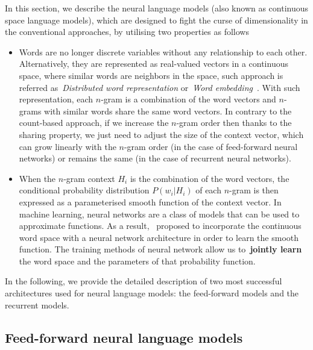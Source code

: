 In this section, we describe the neural language models (also known as continuous space language models), which are designed to fight the curse of dimensionality in the conventional approaches, by utilising two properties as follows

\begin{itemize}
	\item Words are no longer discrete variables without any relationship to each other. Alternatively, they are represented as real-valued vectors in a continuous space, where similar words are neighbors in the space, such approach is referred as~\textit{Distributed word representation} or~\textit{Word embedding}~\cite{bengio2003neural,mikolov2010recurrent}. With such representation, each $n$-gram is a combination of the word vectors and $n$-grams with similar words share the same word vectors.  In contrary to the count-based approach, if we increase the $n$-gram order then thanks to the sharing property, we just need to adjust the size of the context vector, which can grow linearly with the $n$-gram order (in the case of feed-forward neural networks) or remains the same (in the case of recurrent neural networks).
	
	\item When the $n$-gram context $H_i$ is the combination of the word vectors, the conditional probability distribution $P(w_i|H_i)$ of each $n$-gram is then expressed as a parameterised smooth function of the context vector. In machine learning, neural networks are a class of models that can be used to approximate functions. As a result,~ proposed to incorporate the continuous word space with a neural network architecture in order to learn the smooth function. The training methods of neural network allow us to~\textbf{jointly learn} the word space and the parameters of that probability function. 
\end{itemize}

In the following, we provide the detailed description of two most successful architectures used for neural language models: the feed-forward models and the recurrent models.



\subsection{Feed-forward neural language models}



